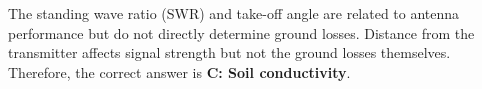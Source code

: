 The standing wave ratio (SWR) and take-off angle are related to antenna performance but do not directly determine ground losses. Distance from the transmitter affects signal strength but not the ground losses themselves. Therefore, the correct answer is \textbf{C: Soil conductivity}.

